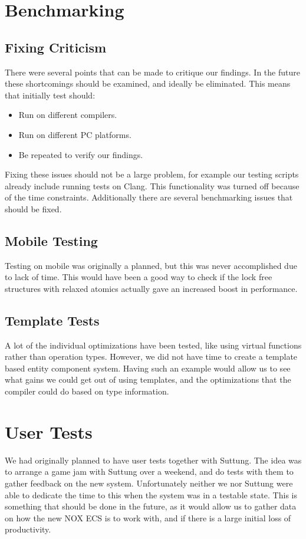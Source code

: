\section{Benchmarking}
\subsection{Fixing Criticism}
There were several points that can be made to critique our findings.
In the future these shortcomings should be examined, and ideally be eliminated.
This means that initially test should:
\begin{itemize}
    \item
    Run on different compilers.
    \item
    Run on different PC platforms.
    \item
    Be repeated to verify our findings.
\end{itemize}
Fixing these issues should not be a large problem, for example our testing scripts already include
running tests on Clang. This functionality was turned off because of the time constraints.
Additionally there are several benchmarking issues that should be fixed.

\subsection{Mobile Testing}
Testing on mobile was originally a planned, but this was never accomplished due to lack of time.
This would have been a good way to check if the lock free structures with relaxed atomics actually
gave an increased boost in performance.

\subsection{Template Tests}
A lot of the individual optimizations have been tested, like using virtual functions rather than
operation types. However, we did not have time to create a template based entity component system.
Having such an example would allow us to see what gains we could get out of using templates,
and the optimizations that the compiler could do based on type information.

\section{User Tests}
We had originally planned to have user tests together with Suttung.
The idea was to arrange a game jam with Suttung over a weekend,
and do tests with them to gather feedback on the new system.
Unfortunately neither we nor Suttung were able to dedicate the time to this when the system
was in a testable state.
This is something that should be done in the future, as it would allow us to gather
data on how the new NOX ECS is to work with, and if there is a large initial loss of productivity.
